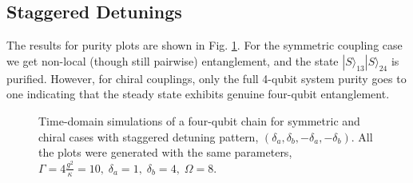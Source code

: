 \subsection{Staggered Detunings}
%
The results for purity plots are shown in Fig. \ref{fig:staggered}. For the symmetric coupling case we get non-local (though still pairwise) entanglement, and the state $|S\rangle_{13}|S\rangle_{24}$ is purified. However, for chiral couplings, only the full 4-qubit system purity goes to one indicating that the steady state exhibits genuine four-qubit entanglement. 
%
\begin{figure}[h!]
\centering
{}
\vspace{-.5cm}
    \caption{Time-domain simulations of a four-qubit chain for symmetric and chiral cases with staggered detuning pattern, $(\delta_a , \delta_b , - \delta_a , - \delta_b )$. All the plots were generated with the same parameters, $\Gamma= 4\frac{g^2}{\kappa}=10, \; \delta_a = 1, \; \delta_b = 4, \; \Omega=8$.}
    \label{fig:staggered}
\end{figure}
%

